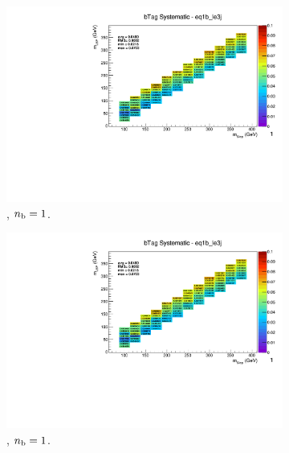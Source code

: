 \begin{figure}[ht!]
\begin{subfigure}[b]{0.32\textwidth}
    \includegraphics[width=\textwidth, page=9]{Figs/sms/t2degen/v19_3/systs/T2_4body_bTag_eq1b_le3j.pdf}
    \caption{\njlow, $n_{\text{b}} = 1$.}
  \end{subfigure}
  \begin{subfigure}[b]{0.32\textwidth}
    \includegraphics[width=\textwidth, page=1]{Figs/sms/t2degen/v19_3/systs/T2_4body_bTag_eq1b_le3j.pdf}
    \caption{\njlow, $n_{\text{b}} = 1$.}
    \label{fig:sms-btag-t2degen-le3j-1b}
  \end{subfigure}\\
  \begin{subfigure}[b]{0.32\textwidth}

\end{subfigure}
\end{figure}
